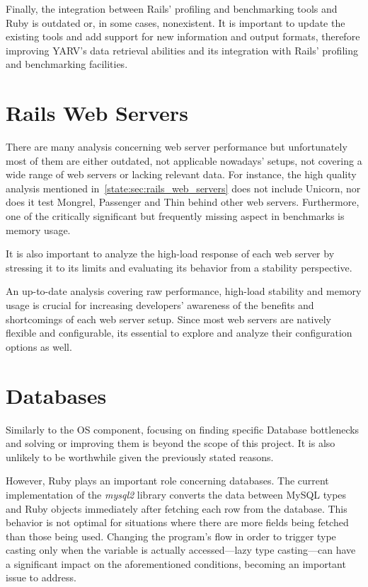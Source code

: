 Finally, the integration between Rails' profiling and benchmarking tools and Ruby is outdated or, in some cases, nonexistent. It is important to update the existing tools and add support for new information and output formats, therefore improving YARV's data retrieval abilities and its integration with Rails' profiling and benchmarking facilities.

\section{Rails Web Servers}
There are many analysis concerning web server performance but unfortunately most of them are either outdated, not applicable nowadays' setups, not covering a wide range of web servers or lacking relevant data. For instance, the high quality analysis mentioned in~\ref{state:sec:rails_web_servers} does not include Unicorn, nor does it test Mongrel, Passenger and Thin behind other web servers. Furthermore, one of the critically significant but frequently missing aspect in benchmarks is memory usage.

It is also important to analyze the high-load response of each web server by stressing it to its limits and evaluating its behavior from a stability perspective. 

An up-to-date analysis covering raw performance, high-load stability and memory usage is crucial for increasing developers' awareness of the benefits and shortcomings of each web server setup. Since most web servers are natively flexible and configurable, its essential to explore and analyze their configuration options as well.

\section{Databases}
Similarly to the OS component, focusing on finding specific Database bottlenecks and solving or improving them is beyond the scope of this project. It is also unlikely to be worthwhile given the previously stated reasons.

However, Ruby plays an important role concerning databases. The current implementation of the \textit{mysql2} library converts the data between MySQL types and Ruby objects immediately after fetching each row from the database. This behavior is not optimal for situations where there are more fields being fetched than those being used. Changing the program's flow in order to trigger type casting only when the variable is actually accessed---lazy type casting---can have a significant impact on the aforementioned conditions, becoming an important issue to address.

